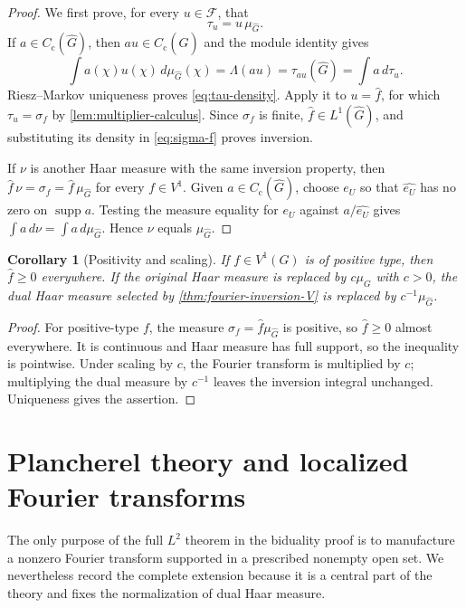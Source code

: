 \documentclass[11pt]{article}
\newtheorem{corollary}[theorem]{Corollary}
\theoremstyle{definition}
\theoremstyle{remark}
\newcommand{\supp}{\operatorname{supp}}
\newcommand{\Cc}{C_{\mathrm c}}
\newcommand{\Lp}[1]{L^{#1}}
\newcommand{\dual}[1]{\widehat{#1}}
\begin{document}
\begin{proof}
We first prove, for every $u\in\mathcal F$, that
\begin{equation}
  \tau_u=u\,\mu_{\dual G}.
  \label{eq:tau-density}
\end{equation}
If $a\in\Cc(\dual G)$, then $au\in\Cc(\dual G)$ and the module identity gives
\[
 \int a(\chi)u(\chi)\,d\mu_{\dual G}(\chi)
 =\Lambda(au)=\tau_{au}(\dual G)=\int a\,d\tau_u.
\]
Riesz--Markov uniqueness proves \eqref{eq:tau-density}.  Apply it to
$u=\widehat f$, for which $\tau_u=\sigma_f$ by
\cref{lem:multiplier-calculus}.  Since $\sigma_f$ is finite,
$\widehat f\in\Lp1(\dual G)$, and substituting its density in
\eqref{eq:sigma-f} proves inversion.

If $\nu$ is another Haar measure with the same inversion property, then
$\widehat f\,\nu=\sigma_f=\widehat f\,\mu_{\dual G}$ for every $f\in V^1$.  Given
$a\in\Cc(\dual G)$, choose $e_U$ so that $\widehat{e_U}$ has no zero on
$\supp a$.  Testing the measure equality for $e_U$ against
$a/\widehat{e_U}$ gives $\int a\,d\nu=\int a\,d\mu_{\dual G}$.  Hence $\nu$ equals
$\mu_{\dual G}$.
\end{proof}

\begin{corollary}[Positivity and scaling]
\label{cor:dual-measure-scaling}
If $f\in V^1(G)$ is of positive type, then $\widehat f\geq0$ everywhere.  If the original
Haar measure is replaced by $c\mu_G$ with $c>0$, the dual Haar measure selected by
\cref{thm:fourier-inversion-V} is replaced by $c^{-1}\mu_{\dual G}$.
\end{corollary}

\begin{proof}
For positive-type $f$, the measure $\sigma_f=\widehat f\mu_{\dual G}$ is positive, so
$\widehat f\geq0$ almost everywhere.  It is continuous and Haar measure has full
support, so the inequality is pointwise.  Under scaling by $c$, the Fourier transform
is multiplied by $c$; multiplying the dual measure by $c^{-1}$ leaves the inversion
integral unchanged.  Uniqueness gives the assertion.
\end{proof}

\section{Plancherel theory and localized Fourier transforms}
\label{sec:plancherel}

The only purpose of the full $\Lp2$ theorem in the biduality proof is to manufacture a
nonzero Fourier transform supported in a prescribed nonempty open set.  We nevertheless
record the complete extension because it is a central part of the theory and fixes the
normalization of dual Haar measure.
\end{document}
